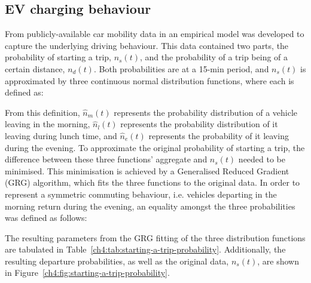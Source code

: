 \subsection{EV charging behaviour}
\label{ch4:subsec:ev-charging-behaviour}


From publicly-available car mobility data in \cite{Dallinger2012, MiD2008} an empirical model was developed to capture the underlying driving behaviour.
This data contained two parts, the probability of starting a trip, $n_{s}(t)$, and the probability of a trip being of a certain distance, $n_{d}(t)$.
Both probabilities are at a 15-min period, and $n_{s}(t)$ is approximated by three continuous normal distribution functions, where each is defined as:



From this definition, $\hat{n}_{m}(t)$ represents the probability distribution  of a vehicle leaving in the morning, $\hat{n}_{l}(t)$ represents the probability distribution of it leaving during lunch time, and $\hat{n}_{e}(t)$ represents the probability of it leaving during the evening.
To approximate the original probability of starting a trip, the difference between these three functions' aggregate and $n_s(t)$ needed to be minimised.
This minimisation is achieved by a Generalised Reduced Gradient (GRG) algorithm, which fits the three functions to the original data.
In order to represent a symmetric commuting behaviour, i.e. vehicles departing in the morning return during the evening, an equality amongst the three probabilities was defined as follows:



The resulting parameters from the GRG fitting of the three distribution functions are tabulated in Table~\ref{ch4:tab:starting-a-trip-probability}.
Additionally, the resulting departure probabilities, as well as the original data, $n_s(t)$, are shown in Figure~\ref{ch4:fig:starting-a-trip-probability}.





